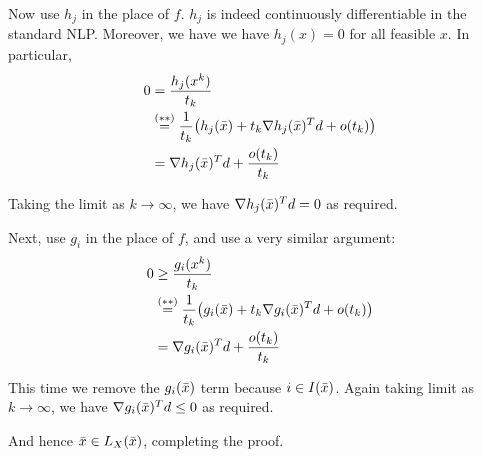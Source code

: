 Now use $h_j$ in the place of $f$. $h_j$ is indeed continuously
differentiable in the standard NLP. Moreover, we have we have
$h_j(x)=0$ for all feasible $x$. In particular,
\begin{align*} 0
	 & = \frac{h_j(x^k)}{t_k}                                                \\
	 & \stackrel{(**)}{=}\frac1{t_k}\big(h_j(\bar x)+t_k\nabla h_j(\bar x)^Td+o(t_k)\big) \\
	 & = \nabla h_j(\bar x)^Td+\frac{o(t_k)}{t_k}
\end{align*}

Taking the limit as $k\to\infty$, we have $\nabla h_j(\bar x)^Td=0$ as
required.

Next, use $g_i$ in the place of $f$, and use a very similar argument:
\begin{align*} 0
	 & \geq\frac{g_i(x^k)}{t_k}                                              \\
	 & \stackrel{(**)}{=}\frac1{t_k}\big(g_i(\bar x)+t_k\nabla g_i(\bar x)^Td+o(t_k)\big) \\
	 & =\nabla g_i(\bar x)^Td+\frac{o(t_k)}{t_k}
\end{align*}

This time we remove the $g_i(\bar x)$ term because $i\in I(\bar x)$. Again
taking limit as $k\to\infty$, we have $\nabla g_i(\bar x)^Td\leq0$ as
required.

And hence $\bar x\in L_X(\bar x)$, completing the proof.
